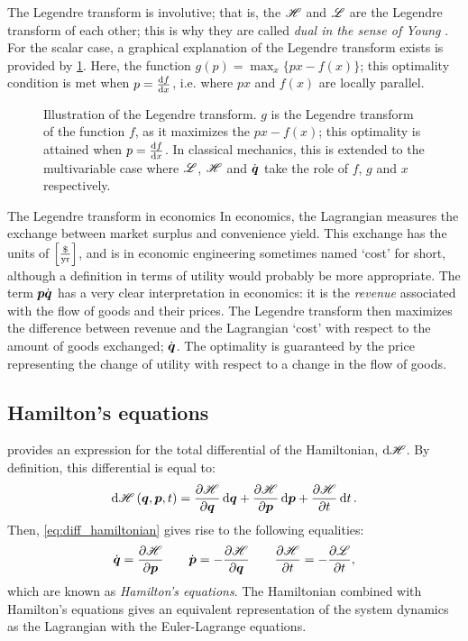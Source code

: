 The Legendre transform is involutive; that is, the $\mathscr{H}$ and $\mathscr{L}$ are the Legendre transform of each other; this is why they are called \emph{dual in the sense of Young} \cite{Arnold1989}. For the scalar case, a graphical explanation of the Legendre transform exists is provided by \cref{fig:legendre_transform}. Here, the function $g(p) = \max_x \{px - f(x)\}$; this optimality condition is met when $p = \dv{f}{x}$, i.e. where $px$ and $f(x)$ are locally parallel.
\begin{figure}
    \centering
    
    \caption{Illustration of the Legendre transform. $g$ is the Legendre transform of the function $f$, as it maximizes the $px - f(x)$; this optimality is attained when $p = \dv{f}{x}$. In classical mechanics, this is extended to the multivariable case where $\mathscr{L}$, $\mathscr{H}$ and $\dot{\vb*{q}}$ take the role of $f$, $g$ and $x$ respectively.}
    \label{fig:legendre_transform}
\end{figure}

\begin{econ}{The Legendre transform in economics}
    In economics, the Lagrangian measures the exchange between market surplus and convenience yield. This exchange has the units of $\qty[\frac{\$}{\text{yr}}]$, and is in economic engineering sometimes named `cost' for short, although a definition in terms of utility would probably be more appropriate. The term $\vb*{p}\dot{\vb*{q}}$ has a very clear interpretation in economics: it is the \emph{revenue} associated with the flow of goods and their prices. The Legendre transform then maximizes the difference between revenue and the Lagrangian `cost' with respect to the amount of goods exchanged; $\dot{\vb*{q}}$. The optimality is guaranteed by the price representing the change of utility with respect to a change in the flow of goods.
\end{econ}

\subsection{Hamilton's equations}
 provides an expression for the total differential of the Hamiltonian, $\dd{\ensuremath{\mathscr{H}}}$. By definition, this differential is equal to:
$$ \dd{\ensuremath{\mathscr{H}}}(\vb*{q}, \vb*{p}, t) = \pdv{\ensuremath{\mathscr{H}}}{\ensuremath{\vb*{q}}}\dd{\ensuremath{\vb*{q}}} + \pdv{\ensuremath{\mathscr{H}}}{\ensuremath{\vb*{p}}}\dd{\ensuremath{\vb*{p}}} + \pdv{\ensuremath{\mathscr{H}}}{t}\dd{t}. $$
Then, \cref{eq:diff_hamiltonian} gives rise to the following equalities:
\begin{equation}
    \dot{\vb*{q}} = \pdv{\ensuremath{\mathscr{H}}}{\ensuremath{\vb*{p}}} \qquad \dot{\vb*{p}} = -\pdv{\ensuremath{\mathscr{H}}}{\ensuremath{\vb*{q}}} \qquad \pdv{\ensuremath{\mathscr{H}}}{t} = - \pdv{\ensuremath{\mathscr{L}}}{t},
    \label{eq:ham_eqs}
\end{equation}
which are known as \emph{Hamilton's equations}. The Hamiltonian combined with Hamilton's equations gives an equivalent representation of the system dynamics as the Lagrangian with the Euler-Lagrange equations.

